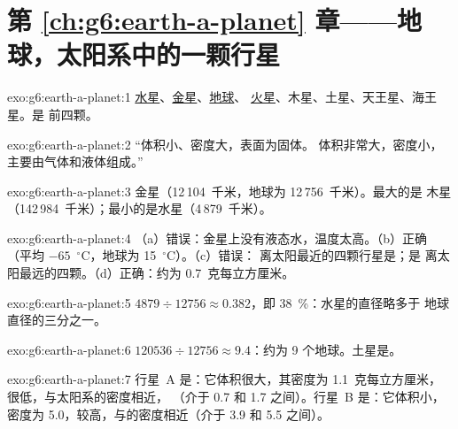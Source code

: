 \section*{第 \ref{ch:g6:earth-a-planet} 章——地球，太阳系中的一颗行星}

\begin{solution}{exo:g6:earth-a-planet:1}
\underline{水星}、\underline{金星}、\underline{地球}、
\underline{火星}、木星、土星、天王星、海王星。是
前四颗。
\end{solution}

\begin{solution}{exo:g6:earth-a-planet:2}
“体积小、密度大，表面为固体。
体积非常大，密度小，主要由气体和液体组成。”
\end{solution}

\begin{solution}{exo:g6:earth-a-planet:3}
金星（12\,104~千米，地球为 12\,756~千米）。最大的是
木星（142\,984~千米）；最小的是水星（4\,879~千米）。
\end{solution}

\begin{solution}{exo:g6:earth-a-planet:4}
（a）错误：金星上没有液态水，温度太高。（b）正确
（平均 $-65$~$^\circ$C，地球为 15~$^\circ$C）。（c）错误：
离太阳最近的四颗行星是；是
离太阳最远的四颗。（d）正确：约为 0.7~克每立方厘米。
\end{solution}

\begin{solution}{exo:g6:earth-a-planet:5}
$4879 \div 12756 \approx 0.382$，即 38~\%：水星的直径略多于
地球直径的三分之一。
\end{solution}

\begin{solution}{exo:g6:earth-a-planet:6}
$120536 \div 12756 \approx 9.4$：约为 9 个地球。土星是。
\end{solution}

\begin{solution}{exo:g6:earth-a-planet:7}
行星~A 是：它体积很大，其密度为
1.1~克每立方厘米，很低，与太阳系的密度相近，
（介于 0.7 和 1.7 之间）。行星~B 是：它体积小，
密度为 5.0，较高，与的密度相近（介于 3.9 和
5.5 之间）。
\end{solution}

